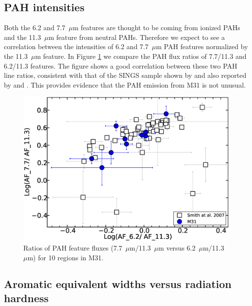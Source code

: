 \subsection{PAH intensities}
\label{sect:pah_ratios}

Both the 6.2 and 7.7~$\mu$m features are thought to be coming from ionized PAHs and the 11.3~$\mu$m feature from neutral PAHs. Therefore we expect to see a correlation between the intensities of 6.2 and 7.7~$\mu$m PAH features normalized by the 11.3~$\mu$m feature. In Figure \ref{PAHlines} we compare the PAH flux ratios of 7.7/11.3  and 6.2/11.3 features. The figure shows a good correlation between these two PAH line ratios, consistent with that of the SINGS sample shown by \citet{Smith:2007lr} and
also reported by  \citet{Galliano2008} and \citet{Vermeij2002}. This provides evidence that the PAH emission from M31 is not unusual. 

\begin{figure}
\centering
\includegraphics[scale = 0.25]{./SINGSnMy.eps}
\caption{Ratios of PAH feature fluxes (7.7~$\mu$m/11.3~$\mu$m versus 6.2~$\mu$m/11.3~$\mu$m) for 10 regions in M31.}
\label{PAHlines}
\end{figure}

\subsection{Aromatic equivalent widths versus radiation hardness}
\label{sect:eqw_rh}


